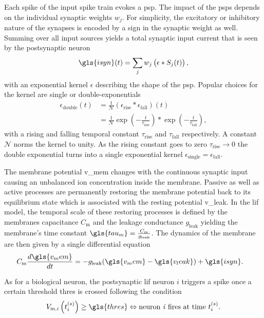 Each spike of the input spike train evokes a \gls{psp}. The impact of the \glspl{psp} depends on the individual synaptic weights $w_j$. For simplicity, the excitatory or inhibitory nature of the synapses is encoded by a sign in the synaptic weight as well. Summing over all input sources yields a total synaptic input current that is seen by the postsynaptic neuron
\begin{equation}
\gls{isyn}(t) = \sum_j w_j \left(\epsilon \ast S_j(t)\right),
\label{synaptic_input}
\end{equation}
with an exponential kernel $\epsilon$ describing the shape of the \gls{psp}. Popular choices for the kernel are single or double-exponentials
\begin{align*}
\epsilon_\text{double}(t) 	&=\frac{1}{\mathcal{N}} \left(\epsilon_\text{rise} \ast \epsilon_\text{fall}\right)(t) \\
&=\frac{1}{\mathcal{N}}\exp \left(-\frac{t}{\tau_\text{rise}} \right)  \ast \exp \left(-\frac{t}{\tau_\text{fall}} \right), 
\end{align*}
with a rising and falling temporal constant $\tau_\text{rise}$ and $\tau_\text{fall}$ respectively. A constant $\mathcal{N}$ norms the kernel to unity. As the rising constant goes to zero $\tau_\text{rise} \rightarrow 0$ the double exponential turns into a single exponential kernel $\epsilon_\text{single} = \epsilon_\text{fall}$.

The membrane potential \gls{v_mem} changes with the continuous synaptic input causing an unbalanced ion concentration inside the membrane. Passive as well as active processes are permanently restoring the membrane potential back to its equilibrium state which is associated with the resting potential \gls{v_leak}. In the \gls{lif} model, the temporal scale of these restoring processes is defined by the membranes capacitance $C_\text{m}$ and the leakage conductance $g_\text{leak}$ yielding the membrane's time constant $\gls{tau_m} = \frac{C_\text{m}}{g_\text{leak}}$. The dynamics of the membrane are then given by a single differential equation
\begin{align}
\label{lifeq}
C_{\text{m}} \frac{d\gls{v_mem}}{dt} &= -g_{\text{leak}} (\gls{v_mem} - \gls{v_leak}) + \gls{isyn}.
\end{align}

As for a biological neuron, the postsynaptic \gls{lif} neuron $i$ triggers a spike once a certain threshold \gls{thres} is crossed following the condition
\begin{equation*}
V_{\text{m}, i}\left(t_i^{(s)}\right) \ge \gls{thres} \Leftrightarrow \text{neuron \textit{i} fires at time } t_i^{(s)}.
\end{equation*}

